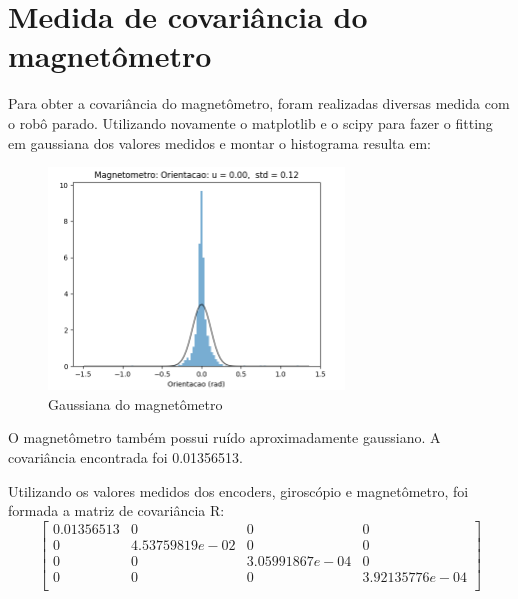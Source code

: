 \documentclass[
	12pt,				%
	openright,			%
	twoside,			%
	convert,
	a4paper,			%
	english,			%
	french,				%
	spanish,			%
	brazil				%
	]{abntex2}
\begin{document}
\section{Medida de covariância do magnetômetro}
Para obter a covariância do magnetômetro, foram realizadas diversas medida com o robô parado. Utilizando novamente o matplotlib e o scipy para fazer o fitting em gaussiana dos valores medidos e montar o histograma resulta em:
\begin{figure}[H]
	\caption{Gaussiana do magnetômetro}
\begin{center}
   \includegraphics[width=0.7\textwidth]{mag_gaussiana}
\end{center}
\end{figure}
O magnetômetro também possui ruído aproximadamente gaussiano. A covariância encontrada foi 0.01356513.
\par
Utilizando os valores medidos dos encoders, giroscópio e magnetômetro, foi formada a matriz de covariância R:
\[
\begin{bmatrix}
	0.01356513 & 0 & 0 & 0\\
	0 & 4.53759819e-02 & 0 & 0\\
	0 & 0 & 3.05991867e-04 & 0\\
	0 & 0 & 0 & 3.92135776e-04\\
\end{bmatrix}
\]
\end{document}
